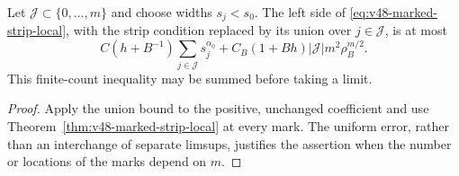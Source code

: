 \begin{corollary}
\label{cor:v48-graded-marks}
Let $\mathcal J\subset\{0,\ldots,m\}$ and choose widths $s_j<s_0$.
The left side of \eqref{eq:v48-marked-strip-local}, with the strip
condition replaced by its union over $j\in\mathcal J$, is at most
\[
 C(h+B^{-1})\sum_{j\in\mathcal J}s_j^{\alpha_0}
       +C_B(1+Bh)|\mathcal J|m^2\rho_B^{m/2}.
\]
This finite-count inequality may be summed before taking a limit.
\end{corollary}
\begin{proof}
Apply the union bound to the positive, unchanged coefficient and use
Theorem~\ref{thm:v48-marked-strip-local} at every mark. The uniform
error, rather than an interchange of separate limsups, justifies the
assertion when the number or locations of the marks depend on $m$.
\end{proof}
